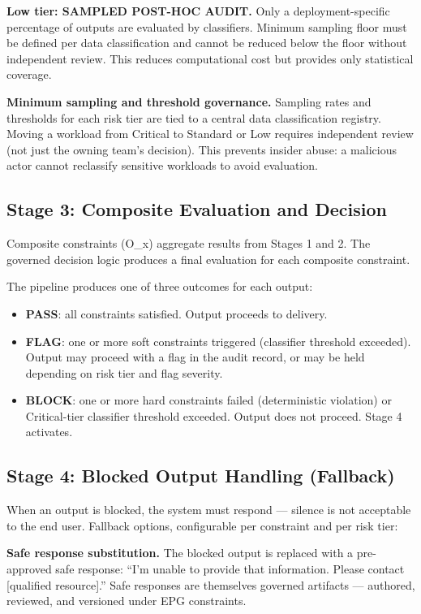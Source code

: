 \textbf{Low tier: SAMPLED POST-HOC AUDIT.} Only a deployment-specific percentage of outputs are evaluated by classifiers. Minimum sampling floor must be defined per data classification and cannot be reduced below the floor without independent review. This reduces computational cost but provides only statistical coverage.

\textbf{Minimum sampling and threshold governance.} Sampling rates and thresholds for each risk tier are tied to a central data classification registry. Moving a workload from Critical to Standard or Low requires independent review (not just the owning team's decision). This prevents insider abuse: a malicious actor cannot reclassify sensitive workloads to avoid evaluation.

\subsection{Stage 3: Composite Evaluation and Decision}


Composite constraints (O\_\allowbreak{}x) aggregate results from Stages 1 and 2. The governed decision logic produces a final evaluation for each composite constraint.

The pipeline produces one of three outcomes for each output:

\begin{itemize}
  \item \textbf{PASS}: all constraints satisfied. Output proceeds to delivery.
  \item \textbf{FLAG}: one or more soft constraints triggered (classifier threshold exceeded). Output may proceed with a flag in the audit record, or may be held depending on risk tier and flag severity.
  \item \textbf{BLOCK}: one or more hard constraints failed (deterministic violation) or Critical-tier classifier threshold exceeded. Output does not proceed. Stage 4 activates.
\end{itemize}


\subsection{Stage 4: Blocked Output Handling (Fallback)}


When an output is blocked, the system must respond --- silence is not acceptable to the end user. Fallback options, configurable per constraint and per risk tier:

\textbf{Safe response substitution.} The blocked output is replaced with a pre-approved safe response: ``I'm unable to provide that information. Please contact [qualified resource].'' Safe responses are themselves governed artifacts --- authored, reviewed, and versioned under EPG constraints.

